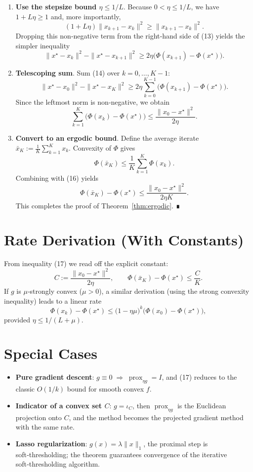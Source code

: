 \documentclass{article}
\newcommand{\prox}{\operatorname{prox}}
\begin{document}
\begin{enumerate}
\[+2\eta\big(\Phi(x_{k+1})-\Phi(x^\star)\big).
\tag{13}
\]
\item[Step 12.] \textbf{Use the stepsize bound $\eta\le 1/L$}.  
Because $0<\eta\le 1/L$, we have $1+L\eta\ge 1$ and, more importantly,
\[
(1+L\eta)\|x_{k+1}-x_k\|^2 \ge \|x_{k+1}-x_k\|^2 .
\]
Dropping this non‑negative term from the right‑hand side of (13) yields the simpler inequality
\[
\|x^\star-x_k\|^2-\|x^\star-x_{k+1}\|^2
\ge 2\eta\big(\Phi(x_{k+1})-\Phi(x^\star)\big).
\tag{14}
\]
\item[Step 13.] \textbf{Telescoping sum}.  
Sum (14) over $k=0,\dots,K-1$:
\[
\|x^\star-x_0\|^2-\|x^\star-x_{K}\|^2
\ge 2\eta\sum_{k=0}^{K-1}\big(\Phi(x_{k+1})-\Phi(x^\star)\big).
\tag{15}
\]
Since the leftmost norm is non‑negative, we obtain
\[
\sum_{k=1}^{K}\big(\Phi(x_{k})-\Phi(x^\star)\big)
\le \frac{\|x_0-x^\star\|^2}{2\eta}.
\tag{16}
\]
\item[Step 14.] \textbf{Convert to an ergodic bound}.  
Define the average iterate $\bar{x}_K:=\frac{1}{K}\sum_{k=1}^{K}x_k$.
Convexity of $\Phi$ gives
\[
\Phi(\bar{x}_K)\le\frac{1}{K}\sum_{k=1}^{K}\Phi(x_k).
\]
Combining with (16) yields
\[
\Phi(\bar{x}_K)-\Phi(x^\star)
\le \frac{\|x_0-x^\star\|^2}{2\eta K}.
\tag{17}
\]
This completes the proof of Theorem~\ref{thm:ergodic}. ∎
\end{enumerate}

\section*{Rate Derivation (With Constants)}
From inequality (17) we read off the explicit constant:
\[
C:=\frac{\|x_0-x^\star\|^2}{2\eta},
\qquad
\Phi(\bar{x}_K)-\Phi(x^\star)\le \frac{C}{K}.
\]
If $g$ is $\mu$‑strongly convex ($\mu>0$), a similar derivation (using the strong convexity inequality) leads to a linear rate
\[
\Phi(x_k)-\Phi(x^\star)\le\big(1-\eta\mu\big)^k\big(\Phi(x_0)-\Phi(x^\star)\big),
\]
provided $\eta\le 1/(L+\mu)$.

\section*{Special Cases}
\begin{itemize}[noitemsep]
    \item \textbf{Pure gradient descent}: $g\equiv0\;\Rightarrow\;\prox_{\eta g}=I$, and (17) reduces to the classic $O(1/k)$ bound for smooth convex $f$.
    \item \textbf{Indicator of a convex set $C$}: $g=\iota_C$, then $\prox_{\eta g}$ is the Euclidean projection onto $C$, and the method becomes the projected gradient method with the same rate.
    \item \textbf{Lasso regularization}: $g(x)=\lambda\|x\|_1$, the proximal step is soft‑thresholding; the theorem guarantees convergence of the iterative soft‑thresholding algorithm.
\end{itemize}
\end{document}
